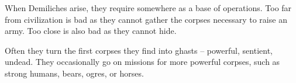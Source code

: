 \begin{multicols}{2}
When Demiliches arise, they require somewhere as a base of operations.
Too far from civilization is bad as they cannot gather the corpses necessary to raise an army.
Too close is also bad as they cannot hide.

Often they turn the first corpses they find into ghasts -- powerful, sentient, undead.
They occasionally go on missions for more powerful corpses, such as strong humans, bears, ogres, or horses.

\demilich

\end{multicols}

\section[\Glsfmtplural{artefact}]{~\E}

